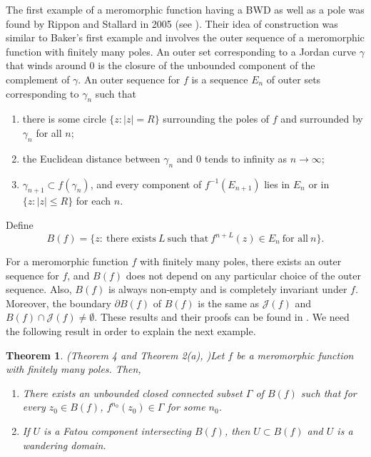 \documentclass[11pt,a4paper]{article}
\newtheorem{theorem}{Theorem}[section]
\begin{document}
	The first example of a meromorphic function having a BWD as well as a pole was found by Rippon and Stallard in 2005 (see \cite{RipponStallard 2005(1)}). Their idea of construction was similar to Baker's first example and involves the outer sequence of a meromorphic function  with finitely many poles. An outer set corresponding to a Jordan curve $\gamma$  that winds around $0$  is the closure of the unbounded component of the complement of $\gamma$. An outer sequence for $f$ is a sequence $E_n$ of outer sets corresponding to $\gamma_n$ such that 
		\begin{enumerate}
		\item  there is some circle $\{z:|z|=R\}$ surrounding the poles of $f$ and surrounded by $\gamma_n$ for all $n$;
		\item  the Euclidean distance between $\gamma_n$ and $0$ tends to infinity as $n\to\infty$;
		\item $\gamma_{n+1}\subset f(\gamma_n)$,  and  every component of $f^{-1}(E_{n+1})$ lies in $E_n$ or in $\{z:|z|\leq R\}$ for each $n$.
	\end{enumerate}
	Define
	$$B(f)=\{z:~\mbox{there exists}~ L ~\mbox{such that}~ f^{n+L}(z)\in E_n ~\mbox{for all}~ n\}.$$

 For a meromorphic function $f$ with finitely many poles, there exists an outer sequence for $f$, and $B(f)$ does not depend on any particular choice of the outer sequence. Also, $B(f)$ is always non-empty and is completely invariant under $f$. Moreover, the boundary $\partial B(f) $ of $B(f)$ is the same as $\mathcal{J}(f)$ and $B(f)\cap\mathcal{J}(f)\neq \emptyset$. These results and their proofs can be found in \cite{RipponStallard 2005(1)}. We need the following result in order to explain the next example.
	\begin{theorem}(Theorem 4 and Theorem 2(a), \cite{RipponStallard 2005(1)})\label{BF}
		Let $f$ be a meromorphic function with finitely many poles. Then,
		\begin{enumerate}
			\item There exists an unbounded closed connected subset $\Gamma$ of $B(f)$ such that for every $z_0\in B(f)$, $f^{n_0}(z_0)\in \Gamma$ for some $n_0$.
			\item If $U$ is a Fatou component intersecting $B(f)$, then $U\subset B(f)$ and $U$ is a wandering domain.
		\end{enumerate}   
	\end{theorem}
	
\end{document}

